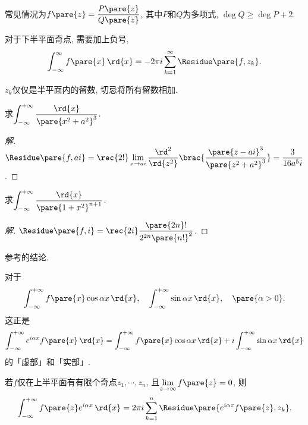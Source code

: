 \documentclass[../ComplexVariable.tex]{subfiles}
\begin{document}
\begin{remark}
    常见情况为$f\pare{z} = \displaystyle \frac{P\pare{z}}{Q\pare{z}}$, 其中$P$和$Q$为多项式, $\deg Q \ge \deg P + 2$.
\end{remark}
\begin{remark}
    对于下半平面奇点, 需要加上负号,
    \[ \int_{-\infty}^\infty f\pare{x}\,\rd{x} = -2\pi i\sum_{k=1}^\infty \Residue\pare{f,z_k}. \]
\end{remark}
\begin{remark}
    $z_k$仅仅是半平面内的留数, 切忌将所有留数相加.
\end{remark}
\begin{sample}
    \begin{ex}
        求$\displaystyle \int_{-\infty}^{+\infty} \frac{\rd{x}}{\pare{x^2+a^2}^3}$.
    \end{ex}
    \begin{proof}[解]
        $\displaystyle \Residue\pare{f,ai} = \rec{2!}\displaystyle \lim_{z\rightarrow ai} \frac{\rd^2{}}{\rd{z^2}}\brac{\frac{\pare{z-ai}^3}{\pare{z^2+a^2}^3}} = \frac{3}{16a^5 i}$.
    \end{proof}
\end{sample}
\begin{sample}
    \begin{ex}
        求$\displaystyle \int_{-\infty}^{+\infty} \frac{\rd{x}}{\pare{1+x^2}^{n+1}}$.
    \end{ex}
    \begin{proof}[解]
        $\Residue\pare{f,i} = \displaystyle \rec{2i} \frac{\pare{2n}!}{2^{2n}\pare{n!}^2}$.
    \end{proof}
\end{sample}
\begin{remark}
    参考的结论.
\end{remark}
对于
\[ \int_{-\infty}^{+\infty} f\pare{x}\cos\alpha x\,\rd{x},\quad \int_{-\infty}^{+\infty} \sin\alpha x\,\rd{x},\quad \pare{\alpha > 0}. \]
这正是
\[ \int_{-\infty}^{+\infty} e^{i\alpha x} f\pare{x}\,\rd{x} = \int_{-\infty}^{+\infty} f\pare{x}\cos\alpha x\,\rd{x} + i \int_{-\infty}^{+\infty} \sin\alpha x\,\rd{x} \]
的「虚部」和「实部」.
\begin{theorem}
    若$f$仅在上半平面有有限个奇点$z_1,\cdots, z_n$, 且$\displaystyle \lim_{z\rightarrow \infty} f\pare{z} = 0$, 则
    \[ \int_{-\infty}^{+\infty} f\pare{z}e^{i\alpha x} \,\rd{x} = 2\pi i \sum_{k=1}^n \Residue\pare{e^{i\alpha z}f\pare{z}, z_k}. \]
\end{theorem}
\end{document}
